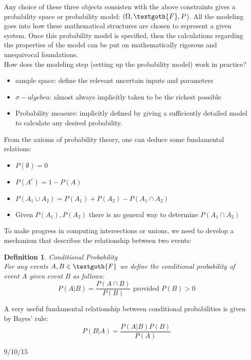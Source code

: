 \documentclass[12pt]{article}
\numberwithin{equation}{section}
\newtheorem{definition}[theorem]{Definition}
\begin{document}
Any choice of these three objects consisten with the above constraints gives a probability space or probability model: $(\Omega,\textgoth{F},P$). All the modeling goes into how these mathematical structures are chosen to represent a given system. Once this probability model is specified, then the calculations regarding the properties of the model can be put on mathematically rigorous and unequivocal foundations.\\

How does the modeling step (setting up the probability model) work in practice?
\begin{itemize}
    \item sample space: define the relevant uncertain inputs and parameters
    \item $\sigma-algebra$: almost always implicitly taken to be the richest possible
    \item Probability measure: implicitly defined by giving a sufficiently detailed model to calculate any desired probability.
\end{itemize}

From the axioms of probability theory, one can deduce some fundamental relations:
\begin{itemize}
    \item $P(\emptyset)=0$
    \item $P(A^c)=1-P(A)$
    \item $P(A_1\cup A_2)=P(A_1)+P(A_2)-P(A_1\cap A_2)$
    \item Given $P(A_1),P(A_2)$ there is no general way to determine $P(A_1\cap A_2)$
\end{itemize}

To make progress in computing intersections or unions, we need to develop a mechanism that describes the relationship between two events:
\begin{definition} Conditional Probability\\
For any events $A,B\in\textgoth{F}$ we define the conditional probability of event $A$ given event $B$ as follows:
$$P(A|B)=\frac{P(A\cap B)}{P(B)}\text{ provided }P(B)>0$$
\end{definition}

A very useful fundamental relationship between conditional probabilities is given by Bayes' rule:
$$P(B|A)=\frac{P(A|B)P(B)}{P(A)}$$

\pagebreak

9/10/15\\
\end{document}
